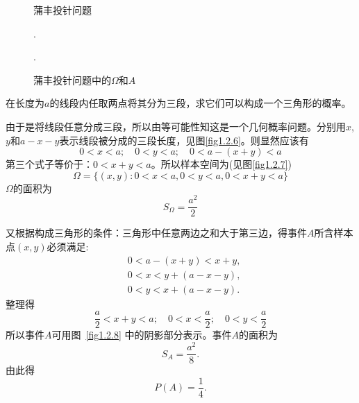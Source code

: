 \begin{figure}
    \centering
    \begin{minipage}[b]{0.5\linewidth}
        \centering
        \caption{蒲丰投针问题}.
        \label{fig1.2.4}
    \end{minipage}
    \begin{minipage}[b]{0.5\linewidth}
        \centering
        \caption{蒲丰投针问题中的$\Omega$和$A$}.
        \label{fig1.2.5}
    \end{minipage}
\end{figure}

\begin{example}
    在长度为$a$的线段内任取两点将其分为三段，求它们可以构成一个三角形的概率。
\end{example}

\begin{solution}
    由于是将线段任意分成三段，所以由等可能性知这是一个几何概率问题。分别用$x$,$y$和$a - x - y$表示线段被分成的三段长度，见图\ref{fig1.2.6}。则显然应该有
    \[ 0 < x < a; \quad 0 < y < a; \quad 0 < a - (x + y) < a \]
    第三个式子等价于：$0 < x + y < a$。所以样本空间为(见图\ref{fig1.2.7})
    \[ \Omega = \{(x, y): 0 < x < a, 0 < y < a, 0 < x + y < a\} \]
   $\Omega$的面积为
    \[ S_\Omega = \frac{a^2}{2} \]

    又根据构成三角形的条件：三角形中任意两边之和大于第三边，得事件$A$所含样本点$(x,y)$必须满足:
    \begin{align*}
         & 0 < a - (x + y) < x + y, \\
         & 0 < x < y + (a - x - y), \\
         & 0 < y < x + (a - x - y).
    \end{align*}
    整理得
    \[ \frac{a}{2} < x + y < a;\quad 0 < x < \frac{a}{2}; \quad 0 < y < \frac{a}{2} \]
    所以事件$A$可用图~\ref{fig1.2.8} 中的阴影部分表示。事件$A$的面积为
    \[ S_A = \frac{a^2}{8}. \]
    由此得
    \[P(A) = \frac1{4}. \]
\end{solution}

